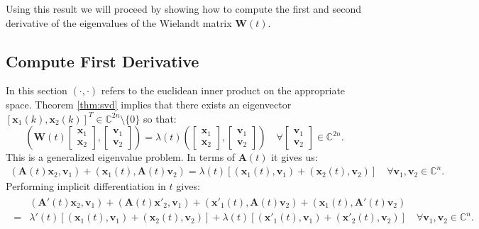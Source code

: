 \documentclass[a4paper, oneside]{discothesis}
\begin{document}
Using this result we will proceed by showing how to compute the first and second derivative of the eigenvalues of the Wielandt matrix $\mathbf{W}(t)$.
\subsection{Compute First Derivative}
In this section $(\cdot,\cdot)$ refers to the euclidean inner product on the appropriate space.
Theorem \ref{thm:svd} implies that there exists an eigenvector $ [\mathbf{x}_1(k), \mathbf{x}_2(k)]^T \in \mathbb{C}^{2n} \setminus \{0\}$ so that:
\begin{equation}
	\left(\mathbf{W}(t)
		\begin{bmatrix}
			\mathbf{x}_1 \\ \mathbf{x}_2
		\end{bmatrix}
		,
		\begin{bmatrix}
			\mathbf{v}_1 \\ \mathbf{v}_2
		\end{bmatrix}
		\right) = \lambda(t) \left(
		\begin{bmatrix}
			\mathbf{x}_1 \\ \mathbf{x}_2
		\end{bmatrix}
		,
		\begin{bmatrix}
			\mathbf{v}_1 \\ \mathbf{v}_2
		\end{bmatrix}
	\right) \quad \forall 
	\begin{bmatrix}
		\mathbf{v}_1 \\ \mathbf{v}_2
	\end{bmatrix}
	\in \mathbb{C}^{2n}.
\end{equation}
This is a generalized eigenvalue problem.
In terms of $\mathbf{A}(t)$ it gives us:
\begin{align}
	(\mathbf{A}(t)\mathbf{x}_2, \mathbf{v}_1) + (\mathbf{x}_1(t),\mathbf{A}(t)\mathbf{v}_2) =\lambda(t)[(\mathbf{x}_1(t),\mathbf{v}_1) + (\mathbf{x}_2(t), \mathbf{v}_2)]
	\quad \forall \mathbf{v}_1, \mathbf{v}_2 \in \mathbb{C}^n.  \label{svder1}
\end{align}
Performing implicit differentiation in $t$ gives:
\begin{align}
	\begin{split}
		&(\mathbf{A}'(t)\mathbf{x}_2, \mathbf{v}_1) + (\mathbf{A}(t)\mathbf{x}'_2, \mathbf{v}_1) + (\mathbf{x}'_1(t),\mathbf{A}(t)\mathbf{v}_2) + (\mathbf{x}_1(t),\mathbf{A}'(t)\mathbf{v}_2) 
		\\ = &\lambda'(t)[(\mathbf{x}_1(t),\mathbf{v}_1) + (\mathbf{x}_2(t), \mathbf{v}_2)] + \lambda(t)[(\mathbf{x}'_1(t),\mathbf{v}_1) + (\mathbf{x}'_2(t), \mathbf{v}_2)]
		\quad \forall \mathbf{v}_1, \mathbf{v}_2 \in \mathbb{C}^n.
	\end{split} \label{svder2}
\end{align}
\end{document}
